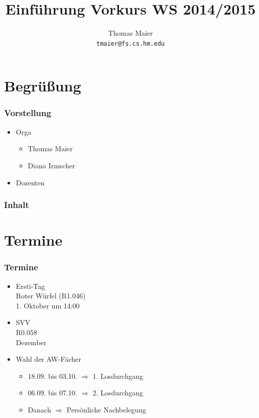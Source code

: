 \documentclass{beamer}
\begin{document}
\title{Einführung Vorkurs WS 2014/2015}
\author[Thomas Maier]{Thomas Maier\\\texttt{tmaier@fs.cs.hm.edu}}

\frame{\titlepage}


\section*{Begrüßung}
\begin{frame}
\frametitle{Vorstellung}
\begin{itemize}
	\item Orga
		\begin{itemize}
			\item Thomas Maier
			\item Diana Irmscher
		\end{itemize}
	\item Dozenten
\end{itemize}
\end{frame}

\begin{frame}
\frametitle{Inhalt}
\tableofcontents
\end{frame}


\section{Termine}
\begin{frame}
\frametitle{Termine}
\begin{itemize}
	\item Ersti-Tag\\Roter Würfel (R1.046)\\1. Oktober um 14:00
	\pause
	\item SVV\\R0.058\\Dezember
	\pause
	\item Wahl der AW-Fächer
	\pause
		\begin{itemize}
			\item 18.09. bis 03.10. $\Rightarrow$ 1. Losdurchgang
			\item 06.09. bis 07.10. $\Rightarrow$ 2. Losdurchgang
			\item Danach $\Rightarrow$ Persönliche Nachbelegung
		\end{itemize}
\end{itemize}
\end{frame}
\end{document}
